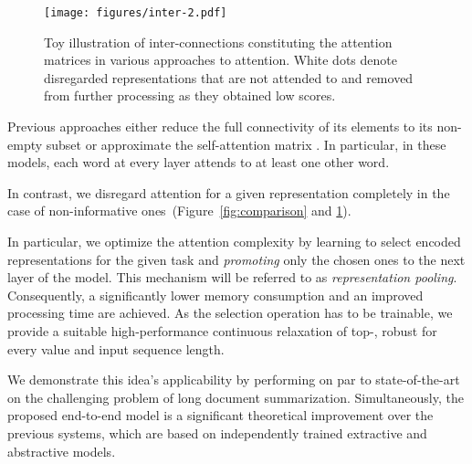 \documentclass{article}
\begin{document}
\begin{figure}
    \centering
\vspace{-15mm}
        \centering
        \texttt{[image: figures/inter-2.pdf]}
        \caption{Toy illustration of inter-connections constituting the attention matrices in various approaches to attention. White dots denote disregarded representations that are not attended to and removed from further processing as they obtained low scores.}

        \label{fig:inter}
\end{figure}

 Previous approaches either reduce the full connectivity of its elements to its non-empty subset or approximate the self-attention matrix \citep{Dai2019TransformerXLAL,Beltagy2020LongformerTL,Kitaev2020ReformerTE,tay2020sparse,zaheer2020big,wang2020linformer,shen2021efficient,choromanski2021rethinking,roy2020efficient}. In particular, in these models, each word at every layer attends to at least one other word.

In contrast, we disregard attention for a given representation completely in the case of non-informative ones~(Figure~\ref{fig:comparison} and \ref{fig:inter}).

In particular, we optimize the attention complexity by learning to select encoded representations for the given task and \textit{promoting} only the chosen ones to the next layer of the model. This mechanism will be referred to as \textit{representation pooling}. Consequently, a significantly lower memory consumption and an improved processing time are achieved. As the selection operation has to be trainable, we provide a suitable high-performance continuous relaxation of top-, robust for every  value and input sequence length. 

We demonstrate this idea's applicability by performing on par to state-of-the-art on the challenging problem of long document summarization. Simultaneously, the proposed end-to-end model is a significant theoretical improvement over the previous systems, which are based on independently trained extractive and abstractive models.
\end{document}
